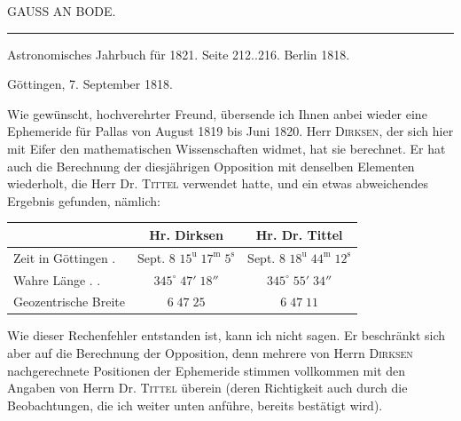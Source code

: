 \clearpage
{}
\hypertarget{native-419-part-lower}{}\label{native-419-part-lower}
\begin{center}
\Large GAUSS AN BODE.
\end{center}

\begin{center}
\rule{6cm}{0.4pt}

Astronomisches Jahrbuch für 1821. Seite 212..216. Berlin 1818.
\end{center}

\begin{flushright}Göttingen, 7. September 1818.\end{flushright}

\par\indent Wie gewünscht, hochverehrter Freund, übersende ich Ihnen anbei wieder eine Ephemeride für Pallas von August 1819 bis Juni 1820. Herr \textsc{Dirksen}, der sich hier mit Eifer den mathematischen Wissenschaften widmet, hat sie berechnet. Er hat auch die Berechnung der diesjährigen Opposition mit denselben Elementen wiederholt, die Herr Dr. \textsc{Tittel} verwendet hatte, und ein etwas abweichendes Ergebnis gefunden, nämlich:

\begin{center}
\setlength{\tabcolsep}{3pt}
\begin{tabular}{l|c|c}
 & Hr. Dirksen & Hr. Dr. Tittel \\
\hline
Zeit in Göttingen . & \shortstack{Sept. 8\\$15^{\mathrm u}\;17^{\mathrm m}\;5^{\mathrm s}$} & \shortstack{Sept. 8\\$18^{\mathrm u}\;44^{\mathrm m}\;12^{\mathrm s}$} \\
Wahre Länge . . & $345^\circ\;47'\;18''$ & $345^\circ\;55'\;34''$ \\
Geozentrische Breite & $6\;47\;25$ & $6\;47\;11$ \\
\end{tabular}
\end{center}

\par\indent Wie dieser Rechenfehler entstanden ist, kann ich nicht sagen. Er beschränkt sich aber auf die Berechnung der Opposition, denn mehrere von Herrn \textsc{Dirksen} nachgerechnete Positionen der  Ephemeride stimmen vollkommen mit den Angaben von Herrn Dr. \textsc{Tittel} überein (deren Richtigkeit auch durch die Beobachtungen, die ich weiter unten anführe, bereits bestätigt wird).

